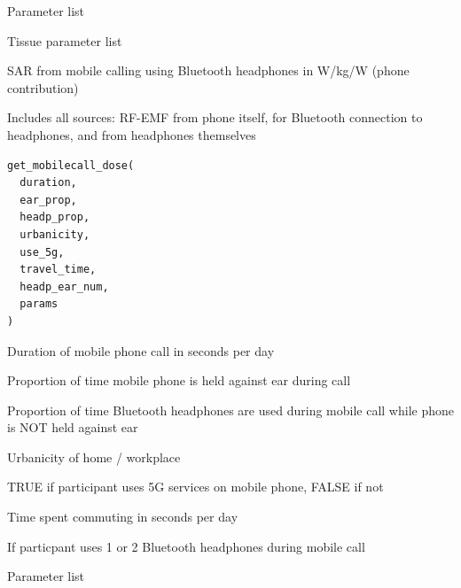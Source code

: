 \documentclass[a4paper]{book}
\begin{document}
%
\begin{Arguments}
\begin{ldescription}
\item[\code{params}] Parameter list

\item[\code{tissue\_params}] Tissue parameter list
\end{ldescription}
\end{Arguments}
%
\begin{Value}
SAR from mobile calling using Bluetooth headphones in W/kg/W (phone contribution)
\end{Value}
%
\begin{Description}
Includes all sources: RF-EMF from phone itself, for Bluetooth connection to
headphones, and from headphones themselves
\end{Description}
%
\begin{Usage}
\begin{verbatim}
get_mobilecall_dose(
  duration,
  ear_prop,
  headp_prop,
  urbanicity,
  use_5g,
  travel_time,
  headp_ear_num,
  params
)
\end{verbatim}
\end{Usage}
%
\begin{Arguments}
\begin{ldescription}
\item[\code{duration}] Duration of mobile phone call in seconds per day

\item[\code{ear\_prop}] Proportion of time mobile phone is held against ear during call

\item[\code{headp\_prop}] Proportion of time Bluetooth headphones are used during mobile call while phone is NOT held against ear

\item[\code{urbanicity}] Urbanicity of home / workplace

\item[\code{use\_5g}] TRUE if participant uses 5G services on mobile phone, FALSE if not

\item[\code{travel\_time}] Time spent commuting in seconds per day

\item[\code{headp\_ear\_num}] If particpant uses 1 or 2 Bluetooth headphones during mobile call

\item[\code{params}] Parameter list
\end{ldescription}
\end{Arguments}
\end{document}
